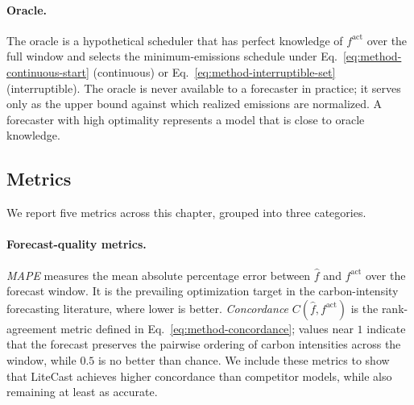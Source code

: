 \paragraph{Oracle.}
The oracle is a hypothetical scheduler that has perfect knowledge of $f^{\text{act}}$ over the full window and selects the minimum-emissions schedule under Eq.~\ref{eq:method-continuous-start} (continuous) or Eq.~\ref{eq:method-interruptible-set} (interruptible).
The oracle is never available to a forecaster in practice; it serves only as the upper bound against which realized emissions are normalized.
A forecaster with high optimality represents a model that is close to oracle knowledge. 

\subsection{Metrics}
\label{sec:eval-metrics}

We report five metrics across this chapter, grouped into three categories.

\paragraph{Forecast-quality metrics.}
\textit{MAPE} measures the mean absolute percentage error between $\hat{f}$ and $f^{\text{act}}$ over the forecast window.
It is the prevailing optimization target in the carbon-intensity forecasting literature, where lower is better.
\textit{Concordance} $C(\hat{f}, f^{\text{act}})$ is the rank-agreement metric defined in Eq.~\ref{eq:method-concordance}; values near $1$ indicate that the forecast preserves the pairwise ordering of carbon intensities across the window, while $0.5$ is no better than chance.
We include these metrics to show that LiteCast achieves higher concordance than competitor models, while also remaining at least as accurate.

